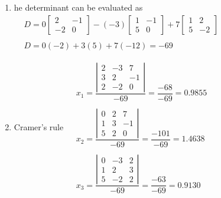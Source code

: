 \documentclass[../main.tex]{subfiles}
\begin{document}
\section{}
\begin{enumerate}[label=\bfseries(\alph*)]
\item he determinant can be evaluated as
\bigbreak$
\begin{aligned}
&D=0\left[\begin{array}{cc}
2 & -1 \\
-2 & 0
\end{array}\right]-(-3)\left[\begin{array}{cc}
1 & -1 \\
5 & 0
\end{array}\right]+7\left[\begin{array}{cc}
1 & 2 \\
5 & -2
\end{array}\right] \\\\
&D=0(-2)+3(5)+7(-12)=-69
\end{aligned}$
\bigbreak
\item Cramer's rule 
\bigbreak$
\begin{aligned}
& x_{1}=\dfrac{\left|\begin{array}{ccc}2 & -3 & 7 \\3 & 2 & -1 \\2 & -2 & 0\end{array}\right|}{-69}=\dfrac{-68}{-69}=0.9855 \\\\
& x_{2}=\dfrac{\left|\begin{array}{ccc}0 & 2 & 7 \\1 & 3 & -1 \\5 & 2 & 0\end{array}\right|}{-69}=\dfrac{-101}{-69}=1.4638 \\\\
& x_{3}=\dfrac{\left|\begin{array}{ccc}0 & -3 & 2 \\1 & 2 & 3 \\5 & -2 & 2\end{array}\right|}{-69}=\dfrac{-63}{-69}=0.9130 
\end{aligned}$
\bigbreak


\end{enumerate}
\end{document}
